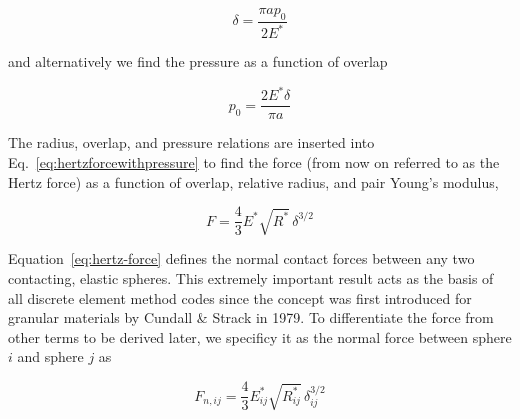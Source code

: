 \begin{equation}
	\delta = \frac{\pi a p_0}{2E^*}
\end{equation}

and alternatively we find the pressure as a function of overlap

\begin{equation}
	p_0 = \frac{2E^*\delta}{\pi a}
\end{equation}

The radius, overlap, and pressure relations are inserted into Eq.~\ref{eq:hertzforcewithpressure} to find the force (from now on referred to as the Hertz force) as a function of overlap, relative radius, and pair Young's modulus,

\begin{equation}\label{eq:hertz-force}
	F = \frac{4}{3}E^* \sqrt{R^*} \, \delta^{3/2}
\end{equation}

Equation~\ref{eq:hertz-force} defines the normal contact forces between any two contacting, elastic spheres. This extremely important result acts as the basis of all discrete element method codes since the concept was first introduced for granular materials by Cundall \& Strack in 1979\cite{Cundall1979}. To differentiate the force from other terms to be derived later, we specificy it as the normal force between sphere $i$ and sphere $j$ as

\begin{equation}\label{eq:hertz-normal-force}
	F_{n,ij} = \frac{4}{3}E_{ij}^* \sqrt{R_{ij}^*} \, \delta_{ij}^{3/2}
\end{equation}






